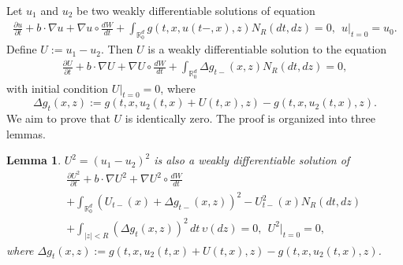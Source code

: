 \documentclass[12pt,oneside, reqno]{amsart}
\newcommand{\be}{\begin{eqnarray}}
\newcommand{\ee}{\end{eqnarray}}
\newtheorem{lemma}[theorem]{Lemma}
\def\no{\nonumber}
\def\mR{{\mathbb R}}
\numberwithin{equation}{section}
\begin{document}
Let $u_1$ and $u_2$ be two weakly differentiable solutions of equation 
\be \label{inicial-equation}
\frac{\partial u}{\partial t}+b\cdot \nabla u+\nabla u \circ \frac{dW}{dt}+\int_{\mR^d_0}g(t,x,u(t-,x),z)N_R(dt,dz)=0,~~u|_{t=0}=u_0.
\ee 
Define $U:=u_1-u_2$. Then $U$ is a weakly differentiable solution to the equation
\be\label{equation-U1}
\frac{\partial U}{\partial t}+b\cdot \nabla U+\nabla U \circ \frac{dW}{dt}+\int_{\mR^d_0}\Delta g_{t-}(x,z)N_R(dt,dz)=0,
\ee
with initial condition $U|_{t=0}=0$, where 
$$\Delta g_t(x,z):=g(t,x,u_2(t,x)+U(t,x),z)-g(t,x,u_2(t,x),z).$$ 
We aim to prove that $U$ is identically zero. The proof is organized into three lemmas.
\begin{lemma}\label{appro-U2}
 $U^2=(u_1-u_2)^2$ is also a weakly differentiable solution of 	
 \be\label{Weakly-diff-solution1}
 &&\frac{\partial U^2}{\partial t}+b\cdot \nabla U^2+\nabla U^2 \circ \frac{dW}{dt}\no\\
 &&+\int_{\mR^d_0}\left(U_{t-}(x)+\Delta g_{t-}(x,z)\right)^2-U_{t-}^2(x)N_R(dt,dz)\no\\
 &&+\int_{|z|<R}\left(\Delta g_{t}(x,z)\right)^2\,dt\,\upsilon(dz)=0,~~U^2|_{t=0}=0,
 \ee
  where $\Delta g_t(x,z):=g(t,x,u_2(t,x)+U(t,x),z)-g(t,x,u_2(t,x),z)$.
	\end{lemma}
\end{document}
